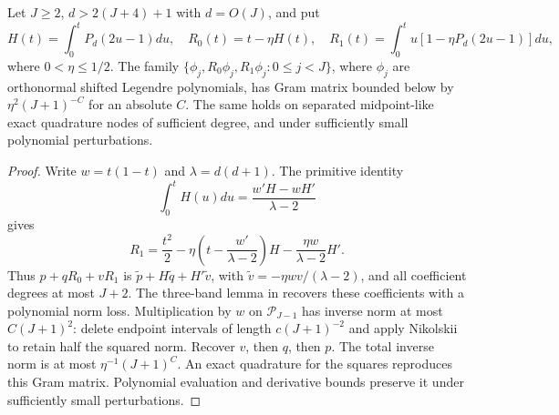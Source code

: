 \documentclass[11pt]{article}
\newcommand{\PP}{\mathcal P}
\begin{document}
\begin{lemma}\label{conditioning}
Let $J\ge2$, $d>2(J+4)+1$ with $d=O(J)$, and put
\[
 H(t)=\int_0^tP_d(2u-1)du,\quad
 R_0(t)=t-\eta H(t),\quad
 R_1(t)=\int_0^t u[1-\eta P_d(2u-1)]du,
\]
where $0<\eta\le1/2$. The family
$\{\phi_j, R_0\phi_j,R_1\phi_j:0\le j<J\}$, where $\phi_j$
are orthonormal shifted Legendre polynomials, has Gram matrix bounded
below by $\eta^2(J+1)^{-C}$ for an absolute $C$.
The same holds on separated midpoint-like exact quadrature nodes of
sufficient degree, and under sufficiently small polynomial perturbations.
\end{lemma}
\begin{proof}
Write $w=t(1-t)$ and $\lambda=d(d+1)$. The primitive identity
\[
 \int_0^tH(u)du=\frac{w'H-wH'}{\lambda-2}
\]
gives
\[
 R_1=\frac{t^2}2-\eta\left(t-\frac{w'}{\lambda-2}\right)H
                    -\frac{\eta w}{\lambda-2}H'.
\]
Thus $p+qR_0+vR_1$ is $\widetilde p+H\widetilde q+H'\widetilde v$,
with $\widetilde v=-\eta wv/(\lambda-2)$, and all coefficient degrees
at most $J+2$. The three-band lemma in
recovers these coefficients with a polynomial norm loss. Multiplication
by $w$ on $\PP_{J-1}$ has inverse norm at most $C(J+1)^2$: delete
endpoint intervals of length $c(J+1)^{-2}$ and apply Nikolskii to
retain half the squared norm. Recover $v$, then $q$, then $p$.
The total inverse norm is at most $\eta^{-1}(J+1)^C$.
An exact quadrature for the squares reproduces this Gram matrix.
Polynomial evaluation and derivative bounds preserve it under sufficiently
small perturbations.
\end{proof}
\end{document}

